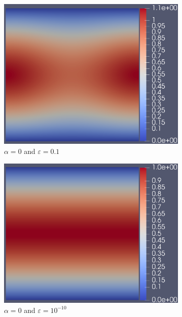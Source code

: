 \documentclass[12pt]{ociamthesis}
\begin{document}
\begin{figure}[H]
 \begin{subfigure}{0.44\textwidth}
     \includegraphics[width=\textwidth]{Pics/uf/U_E1a_eps1.png}
     \caption{$\alpha=0$ and $\varepsilon = 0.1$}
 \end{subfigure}
   \begin{subfigure}{0.44\textwidth}
     \includegraphics[width=\textwidth]{Pics/uf/U_E1a_eps10.png}
     \caption{$\alpha=0$ and $\varepsilon = 10^{-10}$}
 \end{subfigure}
 \begin{subfigure}{0.44\textwidth}

\end{subfigure}
\end{figure}
\end{document}
